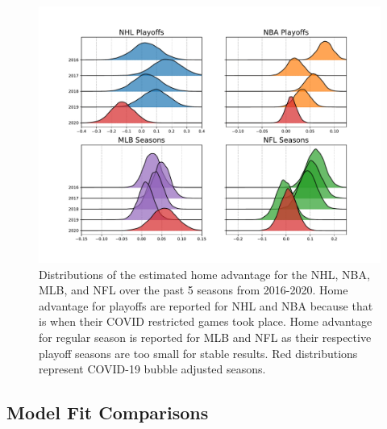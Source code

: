 \begin{figure}
	\centering
	\includegraphics[width=\textwidth]{figures/Figure_2.pdf}
	\caption{Distributions of the estimated home advantage for the NHL, NBA, MLB, and NFL over the past 5 seasons from 2016-2020. Home advantage for playoffs are reported for NHL and NBA because that is when their COVID restricted games took place. Home advantage for regular season is reported for MLB and NFL as their respective playoff seasons are too small for stable results. Red distributions represent COVID-19 bubble adjusted seasons.}
	\label{fig:ha_main}
\end{figure}

\subsection*{Model Fit Comparisons}

